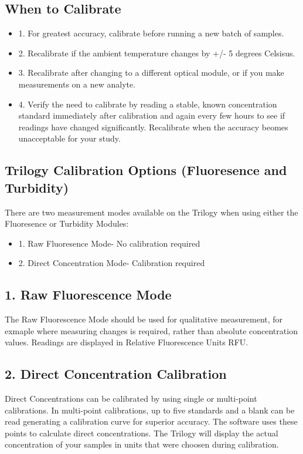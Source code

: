 \documentclass[12pt]{../SOP3_beta}
\begin{document}
\subsection{When to Calibrate}
\begin{itemize}
  \item 1. For greatest accuracy, calibrate before running a new batch of samples.
  \item 2. Recalibrate if the ambient temperature changes by +/- 5 degrees Celsisus.
  \item 3. Recalibrate after changing to a different optical module, or if you make measurements on a new analyte. 
  \item 4. Verify the need to calibrate by reading a stable, known concentration standard immediately after calibration and again every few hours to see if readings have changed significantly. Recalibrate when the accuracy beomes unacceptable for your study.
\end{itemize}

\subsection{Trilogy Calibration Options (Fluoresence and Turbidity)}
\NP There are two measurement modes available on the Trilogy when using either the Fluoresence or Turbidity Modules:
\begin{itemize}
  \item 1. Raw Fluoresence Mode- No calibration required
  \item 2. Direct Concentration Mode- Calibration required 
\end{itemize}

\subsection{1. Raw Fluorescence Mode}
\NP The Raw Fluorescence Mode should be used for qualitative measurement, for exmaple where measuring changes is required, rather than absolute concentration values. Readings are displayed in Relative Fluorescence Units RFU.

\subsection{2. Direct Concentration Calibration}
\NP Direct Concentrations can be calibrated by using single or multi-point calibrations. In multi-point calibrations, up to five standards and a blank can be read generating a calibration curve for superior accuracy. The software uses these points to calculate direct concentrations. The Trilogy will display the actual concentration of your samples in units that were choosen during calibration. 
\end{document}
